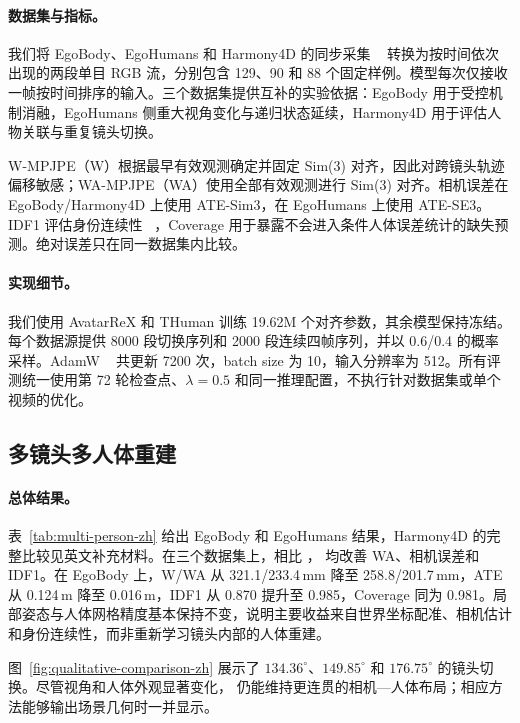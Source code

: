 \paragraph{数据集与指标。}
我们将 EgoBody、EgoHumans 和 Harmony4D 的同步采集
~\citep{zhang2022egobody,khirodkar2023egohumans,khirodkar2024harmony4d}
转换为按时间依次出现的两段单目 RGB 流，分别包含 129、90 和 88 个固定样例。模型每次仅接收一帧按时间排序的输入。三个数据集提供互补的实验依据：EgoBody 用于受控机制消融，EgoHumans 侧重大视角变化与递归状态延续，Harmony4D 用于评估人物关联与重复镜头切换。

W-MPJPE（W）根据最早有效观测确定并固定 Sim(3) 对齐，因此对跨镜头轨迹偏移敏感；WA-MPJPE（WA）使用全部有效观测进行 Sim(3) 对齐。相机误差在 EgoBody/Harmony4D 上使用 ATE-Sim3，在 EgoHumans 上使用 ATE-SE3。IDF1 评估身份连续性
~\citep{ristani2016performance}，Coverage 用于暴露不会进入条件人体误差统计的缺失预测。绝对误差只在同一数据集内比较。

\paragraph{实现细节。}
我们使用 AvatarReX 和 THuman 训练 19.62M 个对齐参数，其余模型保持冻结。每个数据源提供 8000 段切换序列和 2000 段连续四帧序列，并以 0.6/0.4 的概率采样。AdamW
~\citep{loshchilov2019adamw}
共更新 7200 次，batch size 为 10，输入分辨率为 512。所有评测统一使用第 72 轮检查点、$\lambda=0.5$ 和同一推理配置，不执行针对数据集或单个视频的优化。



\subsection{多镜头多人体重建}
\label{sec:main-results-zh}

\paragraph{总体结果。}
表~\ref{tab:multi-person-zh} 给出 EgoBody 和 EgoHumans 结果，Harmony4D 的完整比较见英文补充材料。在三个数据集上，相比 \humanthree{}，\method{} 均改善 WA、相机误差和 IDF1。在 EgoBody 上，W/WA 从 321.1/233.4\,mm 降至 258.8/201.7\,mm，ATE 从 0.124\,m 降至 0.016\,m，IDF1 从 0.870 提升至 0.985，Coverage 同为 0.981。局部姿态与人体网格精度基本保持不变，说明主要收益来自世界坐标配准、相机估计和身份连续性，而非重新学习镜头内部的人体重建。

图~\ref{fig:qualitative-comparison-zh} 展示了 $134.36^\circ$、$149.85^\circ$ 和 $176.75^\circ$ 的镜头切换。尽管视角和人体外观显著变化，\method{} 仍能维持更连贯的相机—人体布局；相应方法能够输出场景几何时一并显示。

